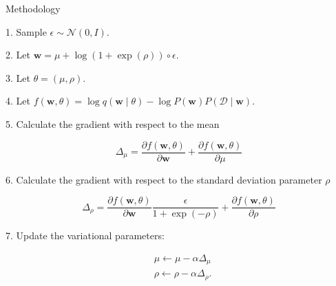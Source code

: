 \documentclass[8pt,xcolor=dvipsnames,compress]{beamer}
\begin{document}
\begin{frame}{Methodology}

1. Sample $\epsilon \sim \mathcal{N}(0, I)$.

2. Let $\mathbf{w}=\mu+\log (1+\exp (\rho)) \circ \epsilon$.

3. Let $\theta=(\mu, \rho)$.

4. Let $f(\mathbf{w}, \theta)=\log q(\mathbf{w} \mid \theta)-\log P(\mathbf{w}) P(\mathcal{D} \mid \mathbf{w})$.

5. Calculate the gradient with respect to the mean

$$
\Delta_{\mu}=\frac{\partial f(\mathbf{w}, \theta)}{\partial \mathbf{w}}+\frac{\partial f(\mathbf{w}, \theta)}{\partial \mu}
$$

6. Calculate the gradient with respect to the standard deviation parameter $\rho$

$$
\Delta_{\rho}=\frac{\partial f(\mathbf{w}, \theta)}{\partial \mathbf{w}} \frac{\epsilon}{1+\exp (-\rho)}+\frac{\partial f(\mathbf{w}, \theta)}{\partial \rho}
$$

7. Update the variational parameters:

$$
\begin{aligned}
& \mu \leftarrow \mu-\alpha \Delta_{\mu} \\
& \rho \leftarrow \rho-\alpha \Delta_{\rho} .
\end{aligned}
$$

\end{frame}
\end{document}
